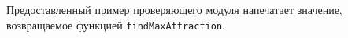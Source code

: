 Предоставленный пример проверяющего модуля напечатает значение, возвращаемое функцией
\texttt{findMaxAttraction}.